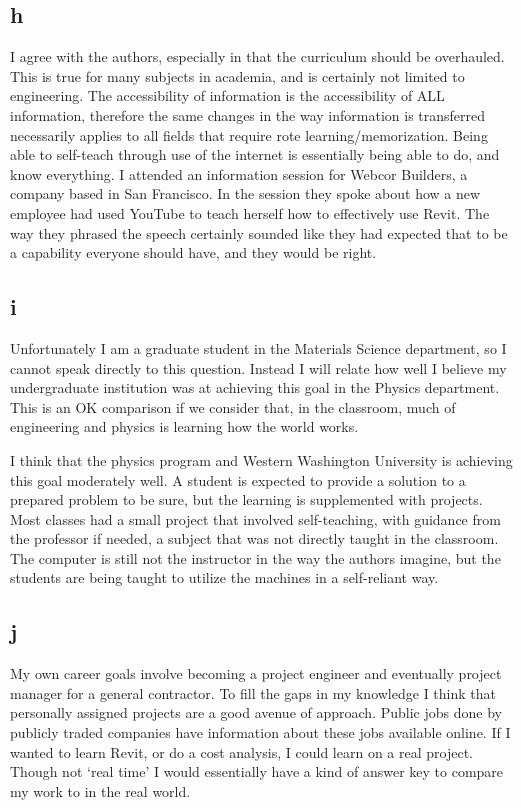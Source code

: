 \documentclass[12pt]{article} %
\begin{document}
	\subsection{h}
		I agree with the authors, especially in that the curriculum should be overhauled. This is true for many subjects in academia, and is certainly not limited to engineering. The accessibility of information is the accessibility of ALL information, therefore the same changes in the way information is transferred necessarily applies to all fields that require rote learning/memorization. Being able to self-teach through use of the internet is essentially being able to do, and know everything. I attended an information session for Webcor Builders, a company based in San Francisco. In the session they spoke about how a new employee had used YouTube to teach herself how to effectively use Revit. The way they phrased the speech certainly sounded like they had expected that to be a capability everyone should have, and they would be right.

	\subsection{i}
		Unfortunately I am a graduate student in the Materials Science department, so I cannot speak directly to this question. Instead I will relate how well I believe my undergraduate institution was at achieving this goal in the Physics department. This is an OK comparison if we consider that, in the classroom, much of engineering and physics is learning how the world works. 

		I think that the physics program and Western Washington University is achieving this goal moderately well. A student is expected to provide a solution to a prepared problem to be sure, but the learning is supplemented with projects. Most classes had a small project that involved self-teaching, with guidance from the professor if needed, a subject that was not directly taught in the classroom. The computer is still not the instructor in the way the authors imagine, but the students are being taught to utilize the machines in a self-reliant way.

	\subsection{j}
		My own career goals involve becoming a project engineer and eventually project manager for a general contractor. To fill the gaps in my knowledge I think that personally assigned projects are a good avenue of approach. Public jobs done by publicly traded companies have information about these jobs available online. If I wanted to learn Revit, or do a cost analysis, I could learn on a real project. Though not ‘real time’ I would essentially have a kind of answer key to compare my work to in the real world.
\end{document}
